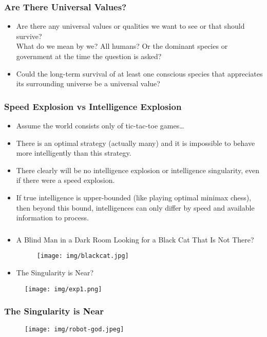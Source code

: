 \documentclass[UTF8,11pt,colorlinks,compress,openany]{beamer}%
\begin{document}
\begin{frame}\frametitle{Are There Universal Values?}
\begin{itemize}
	\item Are there any universal values or qualities we want to see or that should survive?\\
	What do we mean by we? All humans? Or the dominant species or government at the time the question is asked?
	\item Could the long-term survival of at least one conscious species that appreciates its surrounding universe be a universal value?
\end{itemize}	
\end{frame}

\begin{frame}\frametitle{Speed Explosion vs Intelligence Explosion}
\begin{itemize}
	\item Assume the world consists only of tic-tac-toe games\dots
	\item There is an optimal strategy (actually many) and it is impossible to behave more intelligently than this strategy.
	\item There clearly will be no intelligence explosion or intelligence singularity, even if there were a speed explosion.
	\item If true intelligence is upper-bounded (like playing optimal minimax chess), then beyond this bound, intelligences can only differ by speed and available information to process.
\end{itemize}
\end{frame}

\begin{frame}\frametitle{}
	\begin{itemize}
		\item A Blind Man in a Dark Room Looking for a Black Cat That Is Not There?
		\begin{figure}
			\texttt{[image: img/blackcat.jpg]}
		\end{figure}
		\item The Singularity is Near?
	\end{itemize}
		\begin{figure}
			\texttt{[image: img/exp1.png]}
		\end{figure}
\end{frame}

\begin{frame}\frametitle{The Singularity is Near}
\begin{figure}
\texttt{[image: img/robot-god.jpeg]}
\end{figure}
\end{frame}
\end{document}
